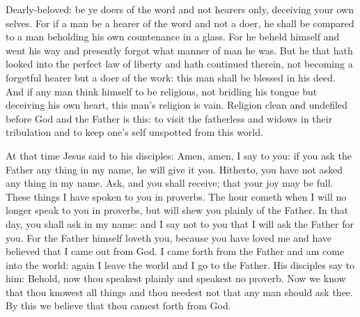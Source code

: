 

Dearly-beloved: be ye doers of the word and not hearers only, deceiving your own selves.
For if a man be a hearer of the word and not a doer, he shall be compared to a
man beholding his own countenance in a glass.  For he beheld himself and went
his way and presently forgot what manner of man he was.  But he that hath
looked into the perfect law of liberty and hath continued therein, not becoming
a forgetful hearer but a doer of the work: this man shall be blessed in his
deed.  And if any man think himself to be religious, not bridling his tongue
but deceiving his own heart, this man's religion is vain.  Religion clean and
undefiled before God and the Father is this: to visit the fatherless and widows
in their tribulation and to keep one's self unspotted from this world.



At that time Jesus said to his disciples:
Amen, amen, I say to you: if
you ask the Father any thing in my name, he will give it you.  Hitherto, you
have not asked any thing in my name. Ask, and you shall receive; that your joy
may be full.  These things I have spoken to you in proverbs. The hour cometh
when I will no longer speak to you in proverbs, but will shew you plainly of
the Father.  In that day, you shall ask in my name: and I say not to you that I
will ask the Father for you.  For the Father himself loveth you, because you
have loved me and have believed that I came out from God.  I came forth from
the Father and am come into the world: again I leave the world and I go to the
Father.  His disciples say to him: Behold, now thou speakest plainly and
speakest no proverb.  Now we know that thou knowest all things and thou needest
not that any man should ask thee. By this we believe that thou camest forth
from God.


\bigskip




